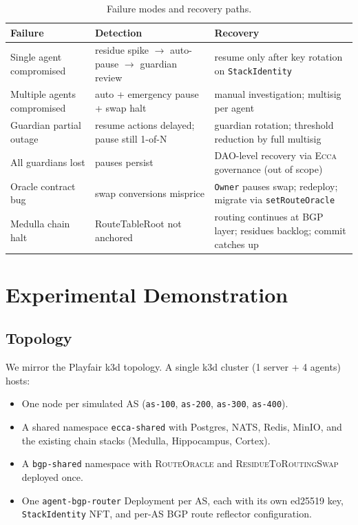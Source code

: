\documentclass[11pt,twocolumn]{article}
\theoremstyle{definition}
\theoremstyle{plain}
\theoremstyle{remark}
\newcommand{\ecca}{\textsc{Ecca}}
\newcommand{\contractname}[1]{\textsc{#1}}
\newcommand{\code}[1]{\texttt{#1}}
\begin{document}
\begin{table}[H]
\centering
\caption{Failure modes and recovery paths.}
\label{tab:failures}
\small
\begin{tabular}{@{}p{2.4cm}p{2.4cm}p{2.6cm}@{}}
\toprule
\textbf{Failure} & \textbf{Detection} & \textbf{Recovery} \\
\midrule
Single agent compromised        & residue spike $\to$ auto-pause $\to$ guardian review & resume only after key rotation on \code{StackIdentity} \\
Multiple agents compromised     & auto + emergency pause + swap halt & manual investigation; multisig per agent \\
Guardian partial outage         & resume actions delayed; pause still 1-of-N & guardian rotation; threshold reduction by full multisig \\
All guardians lost              & pauses persist                            & DAO-level recovery via \ecca{} governance (out of scope) \\
Oracle contract bug             & swap conversions misprice                 & \code{Owner} pauses swap; redeploy; migrate via \code{setRouteOracle} \\
Medulla chain halt              & RouteTableRoot not anchored               & routing continues at BGP layer; residues backlog; commit catches up \\
\bottomrule
\end{tabular}
\end{table}

\section{Experimental Demonstration}\label{sec:experiment}

\subsection{Topology}

We mirror the Playfair k3d topology. A single k3d cluster (1 server + 4 agents) hosts:

\begin{itemize}[leftmargin=*,itemsep=2pt]
  \item One node per simulated AS (\code{as-100}, \code{as-200}, \code{as-300}, \code{as-400}).
  \item A shared namespace \code{ecca-shared} with Postgres, NATS, Redis, MinIO, and the existing chain stacks (Medulla, Hippocampus, Cortex).
  \item A \code{bgp-shared} namespace with \contractname{RouteOracle} and \contractname{ResidueToRoutingSwap} deployed once.
  \item One \code{agent-bgp-router} Deployment per AS, each with its own ed25519 key, \code{StackIdentity} NFT, and per-AS BGP route reflector configuration.
\end{itemize}
\end{document}

